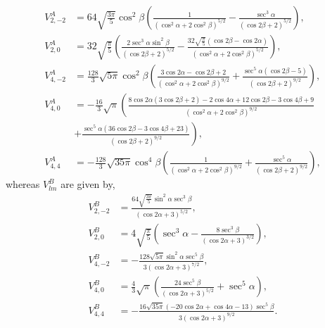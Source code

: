 \documentclass[a4paper,prb,twocolumn]{revtex4-1}  %
\newcommand{\az}[1]{{\color{magenta}{#1}}} %
\begin{document}
\begin{align}
V^A_{2,-2}&= 64 \sqrt{\frac{3 \pi }{5}} \cos ^2\beta  \left(\frac{1}{\left(\cos ^2\alpha +2 \cos ^2\beta \right)^{5/2}}-\frac{\sec ^3\alpha }{(\cos 2 \beta +2)^{5/2}}\right),\\
V^A_{2,0}&= 32 \sqrt{\frac{\pi }{5}} \left(\frac{2 \sec ^3\alpha  \sin ^2\beta }{(\cos 2 \beta +2)^{5/2}}-\frac{32 \sqrt{\frac{\pi }{5}} (\cos 2 \beta -\cos 2 \alpha )}{\left(\cos ^2\alpha +2 \cos ^2\beta \right)^{5/2}}\right),\\
V^A_{4,-2}&= \frac{128}{3} \sqrt{5 \pi } \cos ^2\beta  \left(\frac{3 \cos 2 \alpha -\cos 2 \beta +2}{\left(\cos ^2\alpha +2 \cos ^2\beta \right)^{9/2}}+\frac{\sec ^5\alpha  (\cos 2 \beta -5)}{(\cos 2 \beta +2)^{9/2}}\right),\\ \nonumber
V^A_{4,0}&= -\frac{16}{3} \sqrt{\pi } \left(\frac{8 \cos 2 \alpha  (3 \cos 2 \beta +2)-2 \cos 4 \alpha+12 \cos 2 \beta -3 \cos 4 \beta +9}{\left(\cos ^2\alpha +2 \cos ^2\beta \right)^{9/2}}\right. \\
&+\left. \frac{\sec ^5\alpha  (36 \cos 2 \beta -3 \cos 4 \beta +23)}{(\cos 2 \beta +2)^{9/2}}\right),\\
V^A_{4,4}&=-\frac{128}{3} \sqrt{35 \pi } \cos ^4\beta  \left(\frac{1}{\left(\cos ^2\alpha +2 \cos ^2\beta \right)^{9/2}}+\frac{\sec ^5\alpha }{(\cos 2 \beta +2)^{9/2}}\right),
\end{align}
whereas $V_{lm}^{B}$ are given by,
\begin{align}
V^{B}_{2,-2}&=  \frac{64 \sqrt{\frac{3 \pi }{5}} \sin ^2\alpha  \sec ^3\beta }{(\cos 2 \alpha +3)^{5/2}},
 \\ V^{B}_{2,0}&=  4 \sqrt{\frac{\pi }{5}} \left(\sec ^3\alpha -\frac{8 \sec ^3\beta }{(\cos 2 \alpha +3)^{3/2}}\right),\\
 V^{B}_{4,-2}&=  -\frac{128 \sqrt{5 \pi } \sin ^2\alpha  \sec ^5\beta }{3 (\cos 2 \alpha +3)^{7/2}},\\ 
V^{B}_{4,0}&= \frac{4}{3} \sqrt{\pi } \left(\frac{24 \sec ^5\beta }{(\cos 2 \alpha +3)^{5/2}}+\sec ^5\alpha \right),\\
 V^{B}_{4,4}&=  -\frac{16 \sqrt{35 \pi } (-20 \cos 2 \alpha +\cos 4 \alpha -13) \sec ^5\beta }{3 (\cos 2 \alpha +3)^{9/2}}.
 \end{align}
\end{document}
